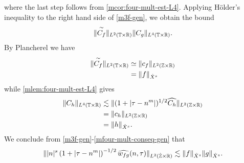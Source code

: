 %
where the last step follows from \cref{mcor:four-mult-est-L4}.
%
%
Applying H\"{o}lder's inequality to the right hand side of
\eqref{m3f-gen}, we obtain the bound
%
\begin{equation}
	\label{m4f-gen}
	\begin{split}
		\|\overset{\sim}{C_f} \|_{L^2(\mathbb{T} \times \mathbb{R})} \|C_g \|_{L^4\left( \mathbb{T} 
		\times \mathbb{R} 
		\right)}. 
	\end{split}
\end{equation}
%
By Plancherel we have
%
%
\begin{equation}
	\label{m5f-gen}
	\begin{split}
		\|\overset{\sim}{C_f} \|_{L^2(\mathbb{T} \times \mathbb{R})}
		& \simeq \|c_f\|_{L^2(\mathbb{Z} \times \mathbb{R})}
		\\
		& = \|f \|_{\dot{X}^s}
	\end{split}
\end{equation}
%
while \cref{mlem:four-mult-est-L4} gives
%
%
\begin{equation}
	\label{mfour-mult-conseq-gen}
	\begin{split}
		\|C_h\|_{L^4(\mathbb{T} \times \mathbb{R})} 
		& \lesssim \|(1 + | \tau - n^m |)^{1/2} \widehat{C_h}
		\|_{L^2(\mathbb{Z} \times \mathbb{R})}
		\\
		& = \|c_{h} \|_{L^2(\mathbb{Z} \times \mathbb{R})} 
		\\
		& = \|h \|_{\dot{X}^s}. 
	\end{split}
\end{equation}
%
%
We conclude from \eqref{m3f-gen}-\eqref{mfour-mult-conseq-gen} that
%
%
\begin{equation*}
	\begin{split}
		\| |n|^s \left( 1 + | \tau - n^m | \right)^{-1/2} \widehat{w_{fg}}(n, \tau) 
		 \|_{L^2(\dot{\mathbb{Z}} \times \mathbb{R})}
		 \lesssim \|f\|_{\dot{X}^s} \|g\|_{\dot{X}^s}.
	\end{split}
\end{equation*}
%
%
%
%
